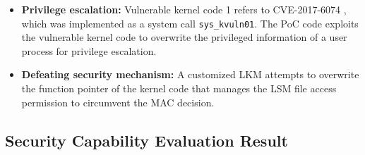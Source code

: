 \begin{itemize}[topsep=0pt]
  
\item {\bf Privilege escalation:} Vulnerable kernel code 1 refers to
  CVE-2017-6074 \cite{CVE-2017-6074}, which was implemented as a system call
  \verb|sys_kvuln01|.
  The PoC code exploits the vulnerable kernel code to overwrite the privileged
  information of a user process for privilege escalation.

  \item {\bf Defeating security mechanism:} A customized LKM attempts to overwrite
  the function pointer of the kernel code that manages the LSM file access
  permission to circumvent the MAC decision.

\end{itemize}


  



\subsection{Security Capability Evaluation Result}
